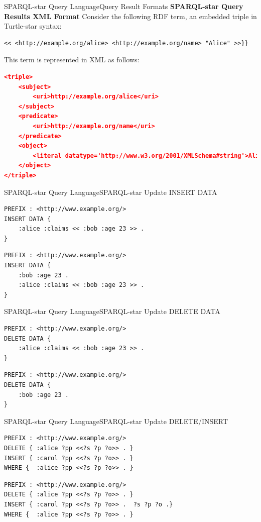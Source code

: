 \documentclass[aspectratio=169]{beamer}
\begin{document}
\begin{frame}[fragile]{SPARQL-star Query Language}{Query Result Formats}
\textbf{SPARQL-star Query Results XML Format}
        Consider the following RDF term, an embedded triple in Turtle-star syntax:
\begin{lstlisting}[language=TTL ]
<< <http://example.org/alice> <http://example.org/name> "Alice" >>}}
\end{lstlisting}
        This term is represented in XML as follows:
\begin{lstlisting}[language=JSON, numbers=none,  basicstyle=\scriptsize, showspaces=false,  showstringspaces=false,  showtabs=false,   ]
<triple>
    <subject>
        <uri>http://example.org/alice</uri>
    </subject>
    <predicate>
        <uri>http://example.org/name</uri>
    </predicate>
    <object>
        <literal datatype='http://www.w3.org/2001/XMLSchema#string'>Alice</literal>
    </object>
</triple>
\end{lstlisting}
 
\end{frame}

\begin{frame}[fragile]{SPARQL-star Query Language}{SPARQL-star Update}
INSERT DATA
 
\begin{lstlisting}[language=SPARQL]
PREFIX : <http://www.example.org/>
INSERT DATA {
    :alice :claims << :bob :age 23 >> .
}
\end{lstlisting}
\begin{lstlisting}[language=SPARQL]
PREFIX : <http://www.example.org/>
INSERT DATA {
    :bob :age 23 .
    :alice :claims << :bob :age 23 >> .
}
\end{lstlisting}
\end{frame}

\begin{frame}[fragile]{SPARQL-star Query Language}{SPARQL-star Update}
 DELETE DATA
\begin{lstlisting}[language=SPARQL]
PREFIX : <http://www.example.org/>
DELETE DATA {
    :alice :claims << :bob :age 23 >> .
}
\end{lstlisting}
\begin{lstlisting}[language=SPARQL]
PREFIX : <http://www.example.org/>
DELETE DATA {
    :bob :age 23 .
}
\end{lstlisting}
\end{frame}

\begin{frame}[fragile]{SPARQL-star Query Language}{SPARQL-star Update}
DELETE/INSERT
\begin{lstlisting}[language=SPARQL]
PREFIX : <http://www.example.org/>
DELETE { :alice ?pp <<?s ?p ?o>> . }
INSERT { :carol ?pp <<?s ?p ?o>> . }
WHERE {  :alice ?pp <<?s ?p ?o>> . }
\end{lstlisting}
\begin{lstlisting}[language=SPARQL]
PREFIX : <http://www.example.org/>
DELETE { :alice ?pp <<?s ?p ?o>> . }
INSERT { :carol ?pp <<?s ?p ?o>> .  ?s ?p ?o .}
WHERE {  :alice ?pp <<?s ?p ?o>> . }
\end{lstlisting}
\end{frame}
\end{document}
